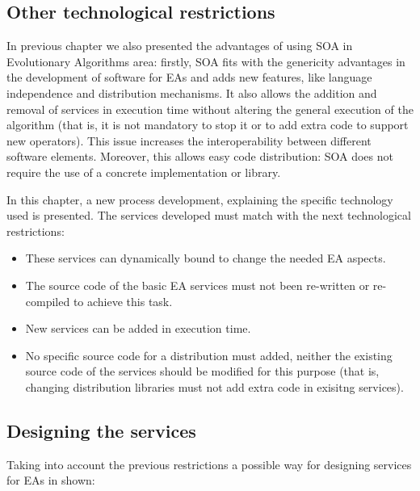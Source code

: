 \subsection{Other technological restrictions}

In previous chapter we also presented the advantages of using SOA in Evolutionary Algorithms area: firstly, SOA fits with the genericity advantages in the development of software for EAs \cite{GENERICITY05} and adds new features, like language independence and  distribution mechanisms. It also allows the addition and removal of services in execution time without altering the general execution of the algorithm (that is, it is not mandatory to stop it or to add extra code to support new operators). This issue increases the interoperability between different software elements. Moreover, this allows easy code distribution: SOA does not require the use of a concrete implementation or library.

In this chapter, a new process development, explaining the specific technology used is presented. The services developed must match with the next technological restrictions:
\begin{itemize}
\item These services can dynamically bound to cha\-nge the needed EA aspects. 
\item The source code of  the basic EA services must not been re-written or re-compiled to achieve this task. 
\item New services can be added in execution time. 
\item No specific source code for a distribution must added, neither the existing source code of the services should be modified for this purpose (that is, changing distribution libraries must not add extra code in exisitng services).
\end{itemize}

\subsection{Designing the services}

Taking into account the previous restrictions a possible way for designing services for EAs in shown:


